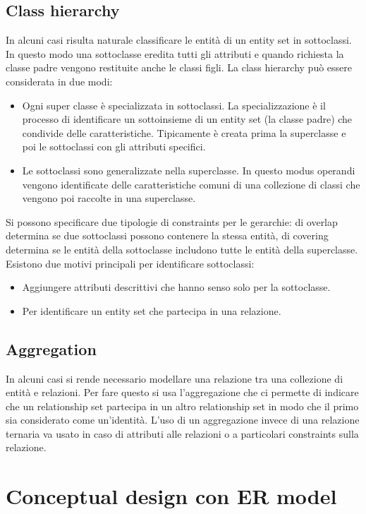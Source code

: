 \subsection{Class hierarchy}
In alcuni casi risulta naturale classificare le entit\`a di un entity set in sottoclassi. In questo modo una sottoclasse eredita tutti gli attributi e quando richiesta la classe padre vengono restituite anche le classi figli. 
La class hierarchy pu\`o essere considerata in due modi:
\begin{itemize}
\item Ogni super classe \`e specializzata in sottoclassi. La specializzazione \`e il processo di identificare un sottoinsieme di un entity set (la classe padre) che condivide delle caratteristiche. Tipicamente \`e creata 
prima la superclasse e poi le sottoclassi con gli attributi specifici. 
\item Le sottoclassi sono generalizzate nella superclasse. In questo modus operandi vengono identificate delle caratteristiche comuni di una collezione di classi che vengono poi raccolte in una superclasse. 
\end{itemize}
Si possono specificare due tipologie di constraints per le gerarchie: di overlap determina se due sottoclassi possono contenere la stessa entit\`a, di covering determina se le entit\`a della sottoclasse includono 
tutte le entit\`a della superclasse. Esistono due motivi principali per identificare sottoclassi:
\begin{itemize}
\item Aggiungere attributi descrittivi che hanno senso solo per la sottoclasse.
\item Per identificare un entity set che partecipa in una relazione.
\end{itemize}
\subsection{Aggregation}
In alcuni casi si rende necessario modellare una relazione tra una collezione di entit\`a e relazioni. Per fare questo si usa l'aggregazione che ci permette di indicare che un relationship set partecipa in un altro 
relationship set in modo che il primo sia considerato come un'identit\`a. L'uso di un aggregazione invece di una relazione ternaria va usato in caso di attributi alle relazioni o a particolari constraints sulla 
relazione. 
\section{Conceptual design con ER model}
